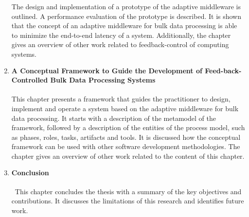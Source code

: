 \begin{enumerate}
	The design and implementation of a prototype of the adaptive middleware is outlined. A performance evaluation of the prototype is described. It is shown that the concept of an adaptive middleware for bulk data processing is able to minimize the end-to-end latency of a system. Additionally, the chapter gives an overview of other work related to feedback-control of computing systems.
	\item \textbf{A Conceptual Framework to Guide the Development of Feed-back-Controlled Bulk Data Processing Systems}\\\\
	This chapter presents a framework that guides the practitioner to design, implement and operate a system based on the adaptive middleware for bulk data processing. It starts with a description of the metamodel of the framework, followed by a description of the entities of the process model, such as phases, roles, tasks, artifacts and tools. It is discussed how the conceptual framework can be used with other software development methodologies. The chapter gives an overview of other work related to the content of this chapter.
	\item \textbf{Conclusion}\\\\\
	This chapter concludes the thesis with a summary of the key objectives and contributions. It discusses the limitations of this research and identifies future work.
\end{enumerate}